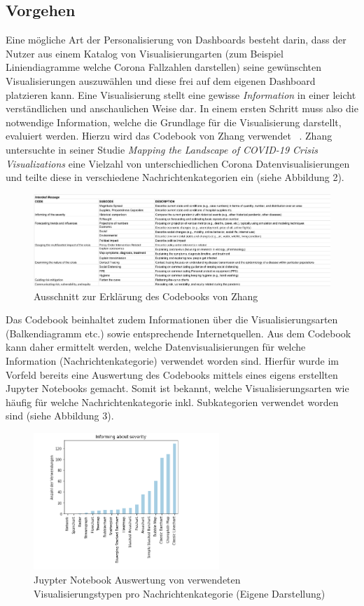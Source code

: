 \documentclass[12pt, oneside]{article}
\begin{document}
\clearpage
\subsection{Vorgehen}
Eine mögliche Art der Personalisierung von Dashboards besteht darin, dass der Nutzer aus einem Katalog von Visualisierungarten (zum Beispiel Liniendiagramme welche Corona Fallzahlen darstellen) seine gewünschten Visualisierungen auszuwählen und diese frei auf dem eigenen Dashboard platzieren kann. Eine Visualisierung stellt eine gewisse \textit{Information} in einer leicht verständlichen und anschaulichen Weise dar. In einem ersten Schritt muss also die notwendige Information, welche die Grundlage für die Visualisierung darstellt, evaluiert werden. Hierzu wird das Codebook von Zhang verwendet ~\citep{YixuanZhang.2021}. Zhang untersuchte in seiner Studie \textit{Mapping the Landscape of COVID-19 Crisis Visualizations} eine Vielzahl von unterschiedlichen Corona Datenvisualisierungen und teilte diese in verschiedene Nachrichtenkategorien ein (siehe Abbildung 2).

\begin{figure}[ht]
	\includegraphics[width=12cm]{images/message_categories_zhang.png}
	\centering
	\caption{Ausschnitt zur Erklärung des Codebooks von Zhang ~\citep{YixuanZhang.2021}}
\end{figure}

Das Codebook beinhaltet zudem Informationen über die Visualisierungsarten (Balkendiagramm etc.) sowie entsprechende Internetquellen. Aus dem Codebook kann daher ermittelt werden, welche Datenvisualisierungen für welche Information (Nachrichtenkategorie) verwendet worden sind. Hierfür wurde im Vorfeld bereits eine Auswertung des Codebooks mittels eines eigens erstellten Jupyter Notebooks gemacht. Somit ist bekannt, welche Visualisierungsarten wie häufig für welche Nachrichtenkategorie inkl. Subkategorien verwendet worden sind (siehe Abbildung 3).


\begin{figure}[ht]
	\includegraphics[width=7cm]{images/visualization_types_for_magnitude_spread.png}
	\centering
	\caption{Juypter Notebook Auswertung von verwendeten Visualisierungstypen pro Nachrichtenkategorie (Eigene Darstellung)}
\end{figure}
\end{document}
